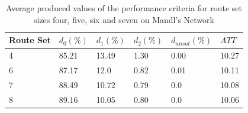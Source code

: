  \begin{table}[H]
    \centering
    \begin{tabular}{|l|l|l|l|l|l|}
    \hline
    Route Set & $d_0(\%)$ & $d_1(\%)$ & $d_2(\%)$ & $d_{unsat}(\%)$ & $ATT$ \\
    \hline
    4 & 85.21 & 13.49 & 1.30 & 0.00 & 10.27\\
    6 & 87.17 & 12.0 & 0.82 & 0.01 & 10.11\\
    7 & 88.49 & 10.72 & 0.79 & 0.0 & 10.08\\
    8 & 89.16 & 10.05 & 0.80 & 0.0 & 10.06\\
    \hline
    \end{tabular}
    \caption {Average produced values of the performance criteria for route set sizes four, five, six and seven on Mandl's Network}
    \label{table:performanceComparison_routesets}
\end{table}







